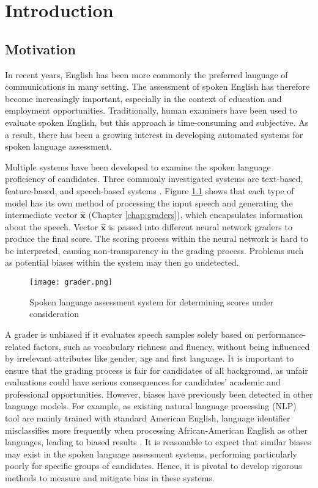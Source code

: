 \chapter{Introduction}

\section{Motivation}
In recent years, English has been more commonly the preferred language of communications in many setting. The assessment of spoken English has therefore become increasingly important, especially in the context of education and employment opportunities. Traditionally, human examiners have been used to evaluate spoken English, but this approach is time-consuming and subjective. As a result, there has been a growing interest in developing automated systems for spoken language assessment.

Multiple systems have been developed to examine the spoken language proficiency of candidates. Three commonly investigated systems are text-based, feature-based, and speech-based systems \cite{graders}. Figure \ref{fig:grader} shows that each type of model has its own method of processing the input speech and generating the intermediate vector $\mathbf{\hat{x}}$ (Chapter \ref{chap:graders}), which encapsulates information about the speech. Vector $\mathbf{\hat{x}}$ is passed into different neural network graders to produce the final score. The scoring process within the neural network is hard to be interpreted, causing non-transparency in the grading process. Problems such as potential biases within the system may then go undetected.

\begin{figure}[H]
    \centering
    \texttt{[image: grader.png]}
    \caption{Spoken language assessment system for determining scores under consideration}
    \label{fig:grader}
\end{figure}

A grader is unbiased if it evaluates speech samples solely based on performance-related factors, such as vocabulary richness and fluency, without being influenced by irrelevant attributes like gender, age and first language. It is important to ensure that the grading process is fair for candidates of all background, as unfair evaluations could have serious consequences for candidates' academic and professional opportunities. However, biases have previously been detected in other language models. For example, as existing natural language processing (NLP) tool are mainly trained with standard American English, language identifier misclassifies more frequently when processing African-American English as other languages, leading to biased results \cite{bias}. It is reasonable to expect that similar biases may exist in the spoken language assessment systems, performing particularly poorly for specific groups of candidates. Hence, it is pivotal to develop rigorous methods to measure and mitigate bias in these systems.

